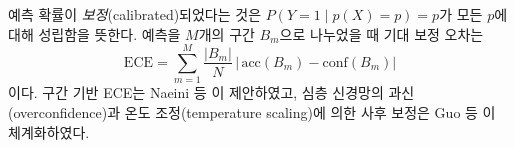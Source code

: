 \begin{definition}[보정과 기대 보정 오차]
예측 확률이 \emph{보정}(calibrated)되었다는 것은 $P(Y=1 \mid p(X)=p) = p$가 모든 $p$에 대해 성립함을 뜻한다. 예측을 $M$개의 구간 $B_m$으로 나누었을 때 기대 보정 오차는
\begin{equation}
  \mathrm{ECE} = \sum_{m=1}^{M} \frac{|B_m|}{N}\,\Big|\,\mathrm{acc}(B_m) - \mathrm{conf}(B_m)\Big|
\end{equation}
이다. 구간 기반 ECE는 Naeini 등 \cite{naeini2015obtaining}이 제안하였고, 심층 신경망의 과신(overconfidence)과 온도 조정(temperature scaling)에 의한 사후 보정은 Guo 등 \cite{guo2017calibration}이 체계화하였다.
\end{definition}
